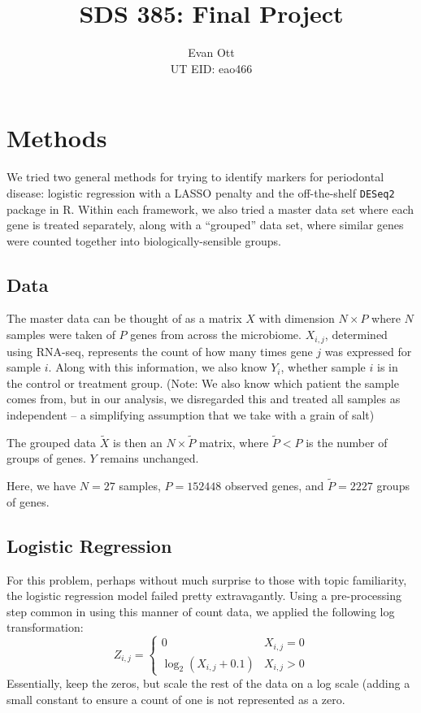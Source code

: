\documentclass{article}
\title{\vspace{-6ex}SDS 385: Final Project\vspace{-2ex}}
\author{Evan Ott \\ UT EID: eao466\vspace{-2ex}}
\begin{document}
\maketitle


\tableofcontents


\section{Methods}
We tried two general methods for trying to identify markers for periodontal disease: logistic regression with a
LASSO penalty and the off-the-shelf \texttt{DESeq2} package in R. Within each framework, we also tried
a master data set where each gene is treated separately, along with a ``grouped'' data set, where similar
genes were counted together into biologically-sensible groups.

\subsection{Data}

The master data can be thought of as a matrix $X$ with dimension $N\times P$ where $N$ samples were taken
of $P$ genes from across the microbiome. $X_{i,j}$, determined using RNA-seq, represents the count of how many
times gene $j$ was expressed for sample $i$. Along with this information, we also know $Y_i$, whether sample
$i$ is in the control or treatment group. (Note: We also know which patient the sample comes from, but in
our analysis, we disregarded this and treated all samples as independent -- a simplifying assumption that we
take with a grain of salt)

The grouped data $\tilde{X}$ is then an $N\times \tilde{P}$ matrix, where $\tilde{P} < P$ is the number of groups
of genes. $Y$ remains unchanged.

Here, we have $N=27$ samples, $P=152448$ observed genes, and $\tilde{P}=2227$ groups of genes.

\subsection{Logistic Regression}

For this problem, perhaps without much surprise to those with topic familiarity, the logistic regression model
failed pretty extravagantly. Using a pre-processing step common in using this manner of count data, we applied
the following log transformation:
$$Z_{i,j}=\left\{\begin{array}{cc}
0 & X_{i,j}=0\\
\log_2 (X_{i,j}+0.1) & X_{i,j} > 0
\end{array}\right.$$
Essentially, keep the zeros, but scale the rest of the data on a log scale (adding a small constant to ensure
a count of one is not represented as a zero.
\end{document}
